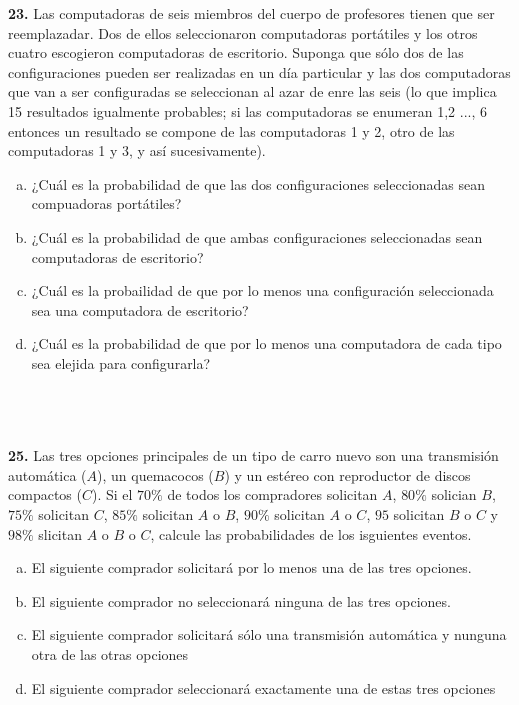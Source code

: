 \documentclass[12pt, letterpaper, spanish]{article}
\begin{document}
\textbf{23.} Las computadoras de seis miembros del cuerpo de profesores tienen que ser reemplazadar. Dos de ellos seleccionaron computadoras portátiles y los otros cuatro escogieron computadoras de escritorio. Suponga que sólo dos de las configuraciones pueden ser realizadas en un día particular y las dos computadoras que van a ser configuradas se seleccionan al azar de enre las seis (lo que implica 15 resultados igualmente probables; si las computadoras se enumeran 1,2 ..., 6 entonces un resultado se compone de las computadoras 1 y 2, otro de las computadoras 1 y 3, y así sucesivamente).
\begin{enumerate}[a)]
    \item ¿Cuál es la probabilidad de que las dos configuraciones seleccionadas sean compuadoras portátiles?
    \item ¿Cuál es la probabilidad de que ambas configuraciones seleccionadas sean computadoras de escritorio?
    \item ¿Cuál es la probailidad de que por lo menos una configuración seleccionada sea una computadora de escritorio?
    \item ¿Cuál es la probabilidad de que por lo menos una computadora de cada tipo sea elejida para configurarla?
\end{enumerate}\\ \\ \\

\textbf{25.} Las tres opciones principales de un tipo de carro nuevo son una transmisión automática ($A$), un quemacocos ($B$) y un estéreo con reproductor de discos compactos ($C$). Si el $70\%$ de todos los compradores solicitan $A$, $80\%$ solician $B$, $75\%$ solicitan $C$, $85\%$ solicitan $A$ o $B$, $90\%$ solicitan $A$ o $C$, $95$ solicitan $B$ o $C$ y $98\%$ slicitan $A$ o $B$ o $C$, calcule las probabilidades de los isguientes eventos.
\begin{enumerate}[a)]
    \item El siguiente comprador solicitará por lo menos una de las tres opciones.
    \item El siguiente comprador no seleccionará ninguna de las tres opciones.
    \item El siguiente comprador solicitará sólo una transmisión automática y nunguna otra de las otras opciones
    \item El siguiente comprador seleccionará exactamente una de estas tres opciones
\end{enumerate}\\ \\ \\
\end{document}
